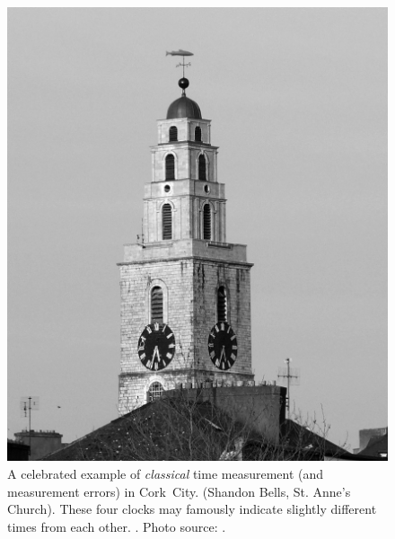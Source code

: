 \begin{savenotes}
\begin{figure}[]
  \centering
  \includegraphics[height=.5\textheight]{img/Shandon_bells_cork.BW.jpg}
  \caption[
    Classical Time. The \emph{Four Faced Liar}, Shandon Bells, Cork
  ]{
    A celebrated example of \emph{classical} time measurement (and measurement errors) in Cork~City.
    (Shandon Bells, St. Anne's Church).
    These four clocks
    may famously
    indicate slightly different times from each other.
    \parencite{CorkStrolls}. Photo source: \cite{ShandonBells}.
  }
  \label{fig:ShandonBells}
\end{figure}
\end{savenotes}